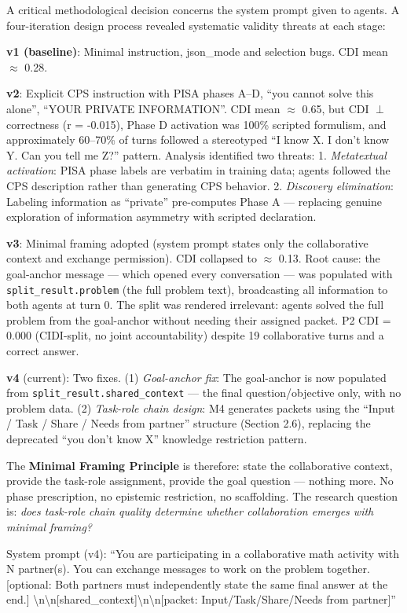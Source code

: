 \documentclass[
  11pt,
]{article}
\begin{document}
A critical methodological decision concerns the system prompt given to
agents. A four-iteration design process revealed systematic validity
threats at each stage:

\textbf{v1 (baseline)}: Minimal instruction, json\_mode and selection
bugs. CDI mean $\approx$ 0.28.

\textbf{v2}: Explicit CPS instruction with PISA phases A--D, ``you
cannot solve this alone'', ``YOUR PRIVATE INFORMATION''. CDI mean $\approx$
0.65, but CDI $\perp$ correctness (r = -0.015), Phase D activation was 100\%
scripted formulism, and approximately 60--70\% of turns followed a
stereotyped ``I know X. I don't know Y. Can you tell me Z?'' pattern.
Analysis identified two threats: 1. \emph{Metatextual activation}: PISA
phase labels are verbatim in training data; agents followed the CPS
description rather than generating CPS behavior. 2. \emph{Discovery
elimination}: Labeling information as ``private'' pre-computes Phase A
--- replacing genuine exploration of information asymmetry with scripted
declaration.

\textbf{v3}: Minimal framing adopted (system prompt states only the
collaborative context and exchange permission). CDI collapsed to $\approx$ 0.13.
Root cause: the goal-anchor message --- which opened every conversation
--- was populated with \texttt{split\_result.problem} (the full problem
text), broadcasting all information to both agents at turn 0. The split
was rendered irrelevant: agents solved the full problem from the
goal-anchor without needing their assigned packet. P2 CDI = 0.000
(CIDI-split, no joint accountability) despite 19 collaborative turns and a correct answer.

\textbf{v4} (current): Two fixes. (1) \emph{Goal-anchor fix}: The
goal-anchor is now populated from \texttt{split\_result.shared\_context}
--- the final question/objective only, with no problem data. (2)
\emph{Task-role chain design}: M4 generates packets using the ``Input /
Task / Share / Needs from partner'' structure (Section 2.6), replacing
the deprecated ``you don't know X'' knowledge restriction pattern.

The \textbf{Minimal Framing Principle} is therefore: state the
collaborative context, provide the task-role assignment, provide the
goal question --- nothing more. No phase prescription, no epistemic
restriction, no scaffolding. The research question is: \emph{does
task-role chain quality determine whether collaboration emerges with
minimal framing?}

System prompt (v4): ``You are participating in a collaborative math
activity with N partner(s). You can exchange messages to work on the
problem together. {[}optional: Both partners must independently state
the same final answer at the end.{]}
\textbackslash{}n\textbackslash{}n[shared\_context]\textbackslash{}n\textbackslash{}n[packet: Input/Task/Share/Needs from partner]''
\end{document}
